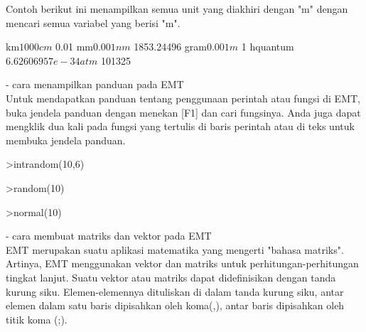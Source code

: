 \documentclass[a4paper,10pt]{article}
\begin{document}
\begin{eulernotebook}
\begin{eulercomment}
\begin{eulercomment}
\begin{eulercomment}
Contoh berikut ini menampilkan semua unit yang diakhiri dengan "m"
dengan mencari semua variabel yang berisi "m\textdollar{}".
\end{eulercomment}
\begin{euleroutput}
  km$                 1000
  cm$                 0.01
  mm$                 0.001
  nm$                 1853.24496
  gram$               0.001
  m$                  1
  hquantum$           6.62606957e-34
  atm$                101325
\end{euleroutput}
\begin{eulercomment}
- cara menampilkan panduan pada EMT\\
Untuk mendapatkan panduan tentang penggunaan perintah atau fungsi di
EMT, buka jendela panduan dengan menekan [F1] dan cari fungsinya. Anda
juga dapat mengklik dua kali pada fungsi yang tertulis di baris
perintah atau di teks untuk membuka jendela panduan.

\end{eulercomment}
\begin{eulerprompt}
>intrandom(10,6)
\end{eulerprompt}
\begin{euleroutput}
  [3,  4,  4,  6,  2,  6,  1,  6,  1,  3]
\end{euleroutput}
\begin{eulerprompt}
>random(10)
\end{eulerprompt}
\begin{euleroutput}
  [0.52143,  0.428893,  0.168134,  0.182742,  0.288048,  0.750042,  0.472935,  0.324407,
  0.340388,  0.195494]
\end{euleroutput}
\begin{eulerprompt}
>normal(10)
\end{eulerprompt}
\begin{euleroutput}
  [-0.277172,  -1.4568,  0.658046,  1.53204,  -2.47296,  -0.937381,  0.836566,  -0.233827,
  0.221796,  -0.541047]
\end{euleroutput}
\begin{eulercomment}
- cara membuat matriks dan vektor pada EMT\\
EMT merupakan suatu aplikasi matematika yang mengerti "bahasa
matriks". Artinya, EMT menggunakan vektor dan matriks untuk
perhitungan-perhitungan tingkat lanjut. Suatu vektor atau matriks
dapat didefinisikan dengan tanda kurung siku. Elemen-elemennya
dituliskan di dalam tanda kurung siku, antar elemen dalam satu baris
dipisahkan oleh koma(,), antar baris dipisahkan oleh titik koma (;).


\end{eulercomment}
\end{eulercomment}
\end{eulercomment}
\end{eulernotebook}
\end{document}
